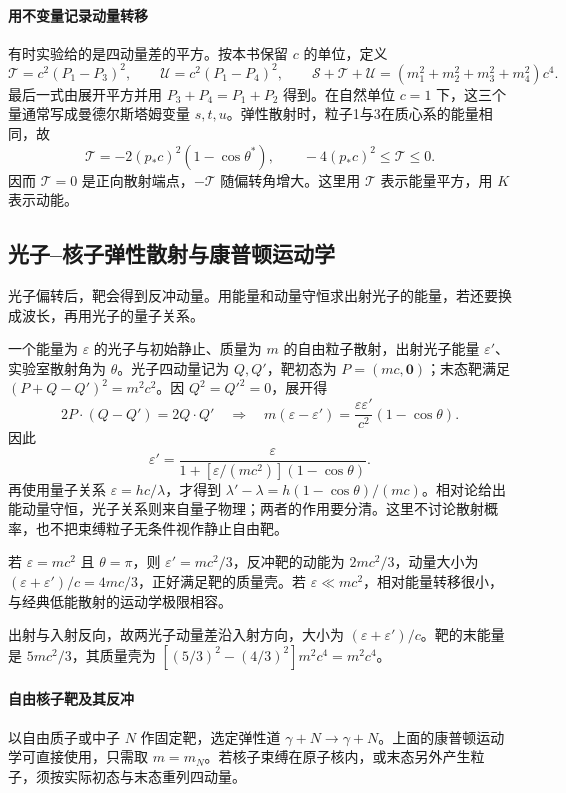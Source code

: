\paragraph{用不变量记录动量转移}
有时实验给的是四动量差的平方。按本书保留 $c$ 的单位，定义
\[
\mathcal T=c^2(P_1-P_3)^2,\qquad
\mathcal U=c^2(P_1-P_4)^2,\qquad
\mathcal S+\mathcal T+\mathcal U=(m_1^2+m_2^2+m_3^2+m_4^2)c^4 .
\]
最后一式由展开平方并用 $P_3+P_4=P_1+P_2$ 得到。在自然单位 $c=1$ 下，这三个量通常写成曼德尔斯塔姆变量 $s,t,u$。弹性散射时，粒子1与3在质心系的能量相同，故
\begin{equation}\label{eq:sr-elastic-transfer}
\mathcal T=-2(p_*c)^2(1-\cos\theta^*),
\qquad -4(p_*c)^2\le\mathcal T\le0 .
\end{equation}
因而 $\mathcal T=0$ 是正向散射端点，$-\mathcal T$ 随偏转角增大。这里用 $\mathcal T$ 表示能量平方，用 $K$ 表示动能。

\subsection{光子--核子弹性散射与康普顿运动学}
光子偏转后，靶会得到反冲动量。用能量和动量守恒求出射光子的能量，若还要换成波长，再用光子的量子关系。

一个能量为 $\varepsilon$ 的光子与初始静止、质量为 $m$ 的自由粒子散射，出射光子能量 $\varepsilon'$、实验室散射角为 $\theta$。光子四动量记为 $Q,Q'$，靶初态为 $P=(mc,\boldsymbol{0})$；末态靶满足 $(P+Q-Q')^2=m^2c^2$。因 $Q^2=Q'^2=0$，展开得
\[
2P\cdot(Q-Q')=2Q\cdot Q'
\quad\Longrightarrow\quad
m(\varepsilon-\varepsilon')=\frac{\varepsilon\varepsilon'}{c^2}(1-\cos\theta).
\]
因此
\[
\boxed{\varepsilon'=\frac{\varepsilon}{1+[\varepsilon/(mc^2)](1-\cos\theta)}}.
\]
再使用量子关系 $\varepsilon=hc/\lambda$，才得到 $\lambda'-\lambda=h(1-\cos\theta)/(mc)$。相对论给出能动量守恒，光子关系则来自量子物理；两者的作用要分清。这里不讨论散射概率，也不把束缚粒子无条件视作静止自由靶。
\begin{example}[反向散射与低能极限]
若 $\varepsilon=mc^2$ 且 $\theta=\pi$，则 $\varepsilon'=mc^2/3$，反冲靶的动能为 $2mc^2/3$，动量大小为 $(\varepsilon+\varepsilon')/c=4mc/3$，正好满足靶的质量壳。若 $\varepsilon\ll mc^2$，相对能量转移很小，与经典低能散射的运动学极限相容。

出射与入射反向，故两光子动量差沿入射方向，大小为 $(\varepsilon+\varepsilon')/c$。靶的末能量是 $5mc^2/3$，其质量壳为 $[(5/3)^2-(4/3)^2]m^2c^4=m^2c^4$。
\end{example}

\paragraph{自由核子靶及其反冲}
以自由质子或中子 $N$ 作固定靶，选定弹性道 $\gamma+N\to\gamma+N$。上面的康普顿运动学可直接使用，只需取 $m=m_N$。若核子束缚在原子核内，或末态另外产生粒子，须按实际初态与末态重列四动量。

